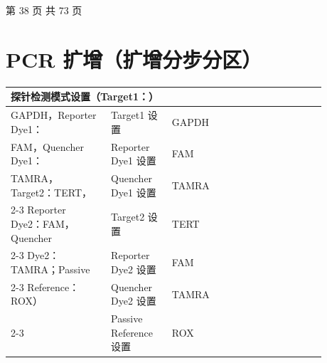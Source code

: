 \documentclass[UTF8,10pt,a4paper,fontset=fandol]{ctexart}
\newcommand{\fieldvalue}[1]{#1}
\newcommand{\handwritten}[1]{#1}
\begin{document}
\begin{center}
第 38 页 共 73 页
\end{center}

\newpage

\section*{PCR 扩增（扩增分步分区）}

\begin{tabular}{|p{0.28\linewidth}|p{0.17\linewidth}|p{0.43\linewidth}|}
\hline
\multicolumn{3}{l|}{探针检测模式设置（Target1：）} \\ \hline
GAPDH，Reporter Dye1： & Target1 设置 &
\fieldvalue{\handwritten{GAPDH}} \\ \hline
FAM，Quencher Dye1： & Reporter Dye1 设置 &
\fieldvalue{\handwritten{FAM}} \\ \hline
TAMRA，Target2：TERT， & Quencher Dye1 设置 &
\fieldvalue{\handwritten{TAMRA}} \\ \cline{2-3}
Reporter Dye2：FAM，Quencher & Target2 设置 &
\fieldvalue{\handwritten{TERT}} \\ \cline{2-3}
Dye2：TAMRA；Passive & Reporter Dye2 设置 &
\fieldvalue{\handwritten{FAM}} \\ \cline{2-3}
Reference：ROX） & Quencher Dye2 设置 &
\fieldvalue{\handwritten{TAMRA}} \\ \cline{2-3}
& Passive Reference 设置 &
\fieldvalue{\handwritten{ROX}} \\ \hline
\end{tabular}

\vspace{2mm}
\end{document}
